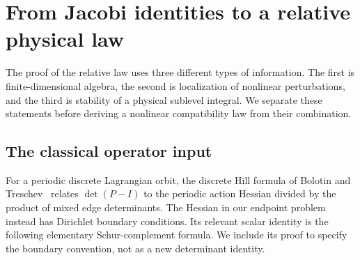 \section{From Jacobi identities to a relative physical law}
\label{sec:v9-operators}
The proof of the relative law uses three different types of information.
The first is finite-dimensional algebra, the second is localization of
nonlinear perturbations, and the third is stability of a physical
sublevel integral. We separate these statements before deriving a
nonlinear compatibility law from their combination.

\subsection{The classical operator input}
For a periodic discrete Lagrangian orbit, the discrete Hill formula
of Bolotin and Treschev~\cite[Theorem~2.1]{Hill} relates
$\det(P-I)$ to the periodic action Hessian divided by the product of
mixed edge determinants. The Hessian in our endpoint problem instead
has Dirichlet boundary conditions. Its relevant scalar identity is the
following elementary Schur-complement formula. We include its proof
to specify the boundary convention, not as a new determinant identity.

